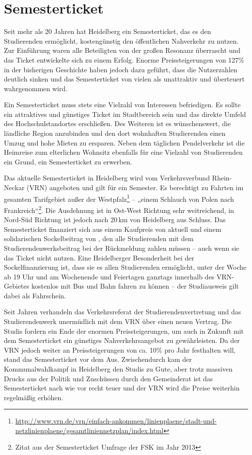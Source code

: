 \section{Semesterticket}
Seit mehr als 20 Jahren hat Heidelberg ein Semesterticket, das es den Studierenden ermöglicht, kostengünstig den öffentlichen Nahverkehr zu nutzen. Zur Einführung waren alle Beteiligten von der großen Resonanz überrascht und das Ticket entwickelte sich zu einem Erfolg. Enorme Preissteigerungen von 127\% in der bisherigen Geschichte haben jedoch dazu geführt, dass die Nutzerzahlen deutlich sinken und das Semesterticket von vielen als unattraktiv und überteuert wahrgenommen wird.

Ein Semesterticket muss stets eine Vielzahl von Interessen befriedigen. Es sollte ein attraktives und günstiges Ticket im Stadtbereich sein und das direkte Umfeld des Hochschulstandortes erschließen. Des Weiteren ist es wünschenswert, die ländliche Region anzubinden und den dort wohnhaften Studierenden einen Umzug und hohe Mieten zu ersparen. Neben dem täglichen Pendelverkehr ist die Heimreise zum elterlichen Wohnsitz ebenfalls für eine Vielzahl von Studierenden ein Grund, ein Semesterticket zu erwerben.

Das aktuelle Semesterticket in Heidelberg wird vom Verkehrsverbund Rhein-Neckar (VRN) angeboten und gilt für ein Semester. Es berechtigt zu Fahrten im gesamten Tarifgebiet außer der Westpfalz\footnote{\url{http://www.vrn.de/vrn/einfach-ankommen/linienplaene/stadt-und-netzlinienplaene/gesamtliniennetzplan/index.html}} -- „einem Schlauch von Polen nach Frankreich“\footnote{Zitat aus der Semesterticket Umfrage der FSK im Jahr 2013}. Die Ausdehnung ist in Ost-West Richtung sehr weitreichend, in Nord-Süd Richtung ist jedoch nach 20\,km von Heidelberg aus Schluss. Das Semesterticket finanziert sich aus einem Kaufpreis von aktuell \EUR{\semesterticket} und einem solidarischen Sockelbeitrag von \EUR{\sockelbeitrag}, den alle Studierenden mit dem Studierendenwerksbeitrag bei der Rückmeldung zahlen müssen -- auch wenn sie das Ticket nicht nutzen. Eine Heidelberger Besonderheit bei der Sockelfinanzierung ist, dass sie es allen Studierenden ermöglicht, unter der Woche ab 19 Uhr und am Wochenende und Feiertagen ganztags innerhalb des VRN-Gebietes kostenlos mit Bus und Bahn fahren zu können -- der Studiausweis gilt dabei als Fahrschein.

Seit Jahren verhandeln das Verkehrsreferat der Studierendenvertretung und das Studierendenwerk unermüdlich mit dem VRN über einen neuen Vertrag. Die Studis fordern ein Ende der enormen Preissteigerungen, um auch in Zukunft mit dem Semesterticket ein günstiges Nahverkehrsangebot zu gewährleisten. Da der VRN jedoch weiter an Preissteigerungen von ca. 10\% pro Jahr festhalten will, stand das Semesterticket vor dem Aus. Zwischendurch kam der Kommunalwahlkampf in Heidelberg den Studis zu Gute, aber trotz massiven Drucks aus der Politik und Zuschüssen durch den Gemeinderat ist das Semesterticket nach wie vor recht teuer und der VRN wird die Preise weiterhin regelmäßig erhöhen.

